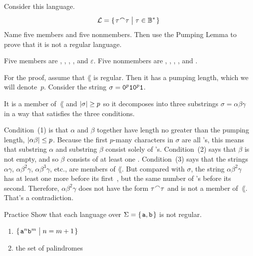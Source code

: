 \documentclass[9pt,t,serif,professionalfont,xcolor={table,dvipsnames},noamsthm]{beamer}
\begin{document}
\begin{frame}
\begin{example}
Consider this language.
\begin{equation*}
  \lang=\set{\tau\concat\tau\suchthat \tau\in\kleenestar{\B}}
\end{equation*}
Name five members and five nonmembers.
Then use the Pumping Lemma to prove that it is not a regular language.

\pause
Five members are
, , , , and $\varepsilon$.
Five nonmembers are , , , , and 
.

For the proof, assume that $\lang$ is regular. 
Then it has a pumping length, which we will denote~$p$.
Consider the string $\sigma=\texttt{0}^p\texttt{1}\texttt{0}^p\texttt{1}$.

It is a member of~$\lang$ and $\lvert\sigma\rvert\geq p$ so it decomposes
into three substrings $\sigma=\alpha\beta\gamma$ in a way that satisfies
the three conditions.

Condition~(1) is that $\alpha$ and $\beta$ together have length
no greater than the pumping length, $\lvert\alpha\beta\rvert\leq p$.
Because the first $p$-many characters in $\sigma$ are all 's,
this means that substring $\alpha$ and substring $\beta$ consist solely of
's.
Condition~(2) says that $\beta$ is not empty,
and so $\beta$ consists of at least one .
Condition~(3) says that the strings 
$\alpha\gamma$, $\alpha\beta^2\gamma$, $\alpha\beta^3\gamma$, etc., are members
of $\lang$.
But compared with $\sigma$,
the string $\alpha\beta^2\gamma$ has at least one more  before 
its first~, 
but the same number of 's before its second.
Therefore, $\alpha\beta^2\gamma$ does not have the form $\tau\concat\tau$
and is not a member of~$\lang$.
That's a contradiction.   
    
\end{example}
\end{frame}


\begin{frame}{Practice}
Show that each language over $\Sigma=\set{\str{a},\str{b}}$ is not regular.
\begin{enumerate}
\item $\set{\str{a}^n\str{b}^m\suchthat n=m+1}$
\pause
\item the set of palindromes
\end{enumerate}
\end{frame}
\end{document}
